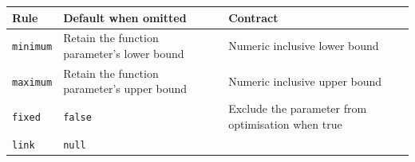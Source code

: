\documentclass[
  10pt,
  a4paper,
  oneside]{scrreprt}
\begin{document}
\begin{longtable}[]{@{}lll@{}}
\toprule
\begin{minipage}[b]{0.30\columnwidth}\raggedright
Rule\strut
\end{minipage} & \begin{minipage}[b]{0.30\columnwidth}\raggedright
Default when omitted\strut
\end{minipage} & \begin{minipage}[b]{0.30\columnwidth}\raggedright
Contract\strut
\end{minipage}\tabularnewline
\midrule
\endhead
\begin{minipage}[t]{0.30\columnwidth}\raggedright
\texttt{minimum}\strut
\end{minipage} & \begin{minipage}[t]{0.30\columnwidth}\raggedright
Retain the function parameter's lower bound\strut
\end{minipage} & \begin{minipage}[t]{0.30\columnwidth}\raggedright
Numeric inclusive lower bound\strut
\end{minipage}\tabularnewline
\begin{minipage}[t]{0.30\columnwidth}\raggedright
\texttt{maximum}\strut
\end{minipage} & \begin{minipage}[t]{0.30\columnwidth}\raggedright
Retain the function parameter's upper bound\strut
\end{minipage} & \begin{minipage}[t]{0.30\columnwidth}\raggedright
Numeric inclusive upper bound\strut
\end{minipage}\tabularnewline
\begin{minipage}[t]{0.30\columnwidth}\raggedright
\texttt{fixed}\strut
\end{minipage} & \begin{minipage}[t]{0.30\columnwidth}\raggedright
\texttt{false}\strut
\end{minipage} & \begin{minipage}[t]{0.30\columnwidth}\raggedright
Exclude the parameter from optimisation when true\strut
\end{minipage}\tabularnewline
\begin{minipage}[t]{0.30\columnwidth}\raggedright
\texttt{link}\strut
\end{minipage} & \begin{minipage}[t]{0.30\columnwidth}\raggedright
\texttt{null}\strut
\end{minipage} & \begin{minipage}[t]{0.30\columnwidth}\raggedright

\end{minipage}
\end{longtable}
\end{document}
